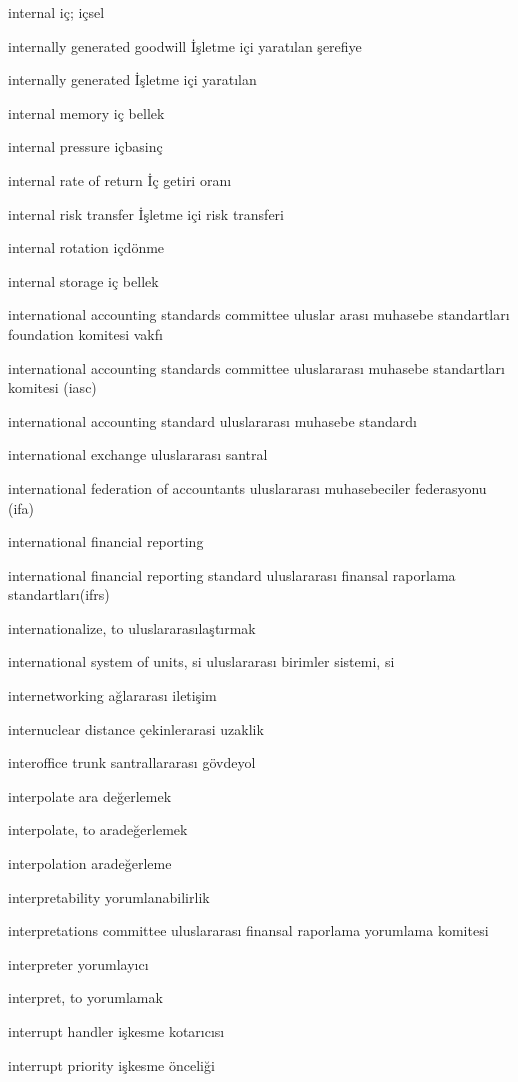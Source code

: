 \documentclass[12pt,fleqn]{article}\usepackage{../../common}
\begin{document}
internal iç; içsel

internally generated goodwill İşletme içi yaratılan şerefiye

internally generated İşletme içi yaratılan

internal memory iç bellek

internal pressure içbasinç

internal rate of return İç getiri oranı

internal risk transfer İşletme içi risk transferi

internal rotation içdönme

internal storage iç bellek

international accounting standards committee uluslar arası muhasebe standartları foundation komitesi vakfı

international accounting standards committee uluslararası muhasebe standartları komitesi (iasc)

international accounting standard uluslararası muhasebe standardı

international exchange uluslararası santral

international federation of accountants uluslararası muhasebeciler federasyonu (ifa)

international financial reporting

international financial reporting standard uluslararası finansal raporlama standartları(ifrs)

internationalize, to uluslararasılaştırmak

international system of units, si uluslararası birimler sistemi, si

internetworking ağlararası iletişim

internuclear distance çekinlerarasi uzaklik

interoffice trunk santrallararası gövdeyol

interpolate ara değerlemek

interpolate, to aradeğerlemek

interpolation aradeğerleme

interpretability yorumlanabilirlik

interpretations committee uluslararası finansal raporlama yorumlama komitesi

interpreter yorumlayıcı

interpret, to yorumlamak

interrupt handler işkesme kotarıcısı

interrupt priority işkesme önceliği
\end{document}
